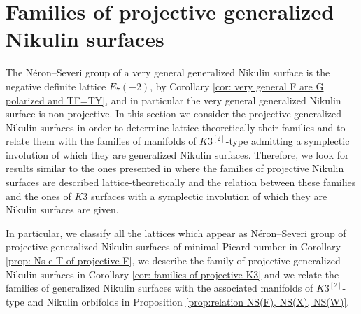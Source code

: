 \documentclass{amsart}
\theoremstyle{definition}
\numberwithin{equation}{section}
\numberwithin{equation}{section} \theoremstyle{definition}
\begin{document}
\section{Families of projective generalized Nikulin surfaces}\label{Families of projective generalized Nikulin surfaces}\label{section: Families of projective generalized Nikulin surfaces}
The N\'eron--Severi group of a very general generalized Nikulin surface is the negative definite lattice $E_7(-2)$, by Corollary \ref{cor: very general F are G polarized and TF=TY}, and in particular the very general generalized Nikulin surface is non projective. In this section we consider the projective generalized Nikulin surfaces in order to determine lattice-theoretically  their families and to relate them with the families of manifolds of $K3^{[2]}$-type admitting a symplectic involution of which they are generalized Nikulin surfaces. 
Therefore, we look for results similar to the ones presented in \cite[Section 2]{GS} where the families of projective Nikulin surfaces are described lattice-theoretically and the relation between these families and the ones of  $K3$ surfaces with a symplectic involution of which they are Nikulin surfaces are given. 

In particular, we classify all the lattices which appear as N\'eron--Severi group of projective generalized Nikulin surfaces of minimal Picard number in Corollary \ref{prop: Ns e T of projective F}, we describe the family of projective generalized Nikulin surfaces in Corollary \ref{cor: families of projective K3} and we relate the families of generalized Nikulin surfaces with the associated manifolds of $K3^{[2]}$-type and Nikulin orbifolds in Proposition \ref{prop:relation NS(F), NS(X), NS(W)}. 
\end{document}
